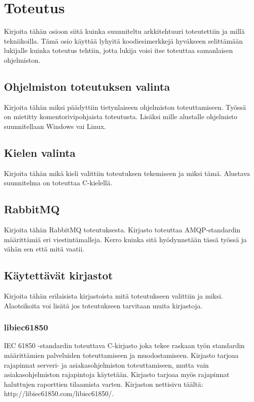 \chapter{Toteutus}
\label{ch:toteutus}
Kirjoita tähän osioon siitä kuinka suunniteltu arkkitehtuuri toteutettiin ja millä tekniikoilla. Tämä osio käyttää lyhyitä koodiesimerkkejä hyväkseen selittämään lukijalle kuinka toteutus tehtiin, jotta lukija voisi itse toteuttaa samanlaisen ohjelmiston.

\section{Ohjelmiston toteutuksen valinta}
Kirjoita tähän miksi päädyttiin tietynlaiseen ohjelmiston toteuttamiseen. Työssä on mietitty komentorivipohjaista toteutusta. Lisäksi mille alustalle ohjelmisto suunnitellaan Windows vai Linux.

\section{Kielen valinta}
Kirjoita tähän mikä kieli valittiin toteutuksen tekemiseen ja miksi tämä. Alustava suunnitelma on toteuttaa C-kielellä.

\section{RabbitMQ}
Kirjoita tähän RabbitMQ toteutuksesta. Kirjasto toteuttaa AMQP-standardin määrittämiä eri viestintämalleja. Kerro kuinka sitä hyödynnetään tässä työssä ja vähän sen että mitä vaatii.

\section{Käytettävät kirjastot}
Kirjoita tähän erilaisista kirjastoista mitä toteutukseen valittiin ja miksi. Alaotsikoita voi lisätä jos toteutukseen tarvitaan muita kirjastoja.

\subsection{libiec61850}
IEC 61850 -standardin toteuttava C-kirjasto joka tekee raskaan työn standardin määrittämien palveluiden toteuttamiseen ja muodostamiseen. Kirjasto tarjoaa rajapinnat serveri- ja asiakasohjelmiston toteuttamiseen, mutta vain asiakasohjelmiston rajapintoja käytetään. Kirjasto tarjoaa myös rajapinnat haluttujen raporttien tilaamista varten. Kirjaston nettisivu täältä: http://libiec61850.com/libiec61850/.

